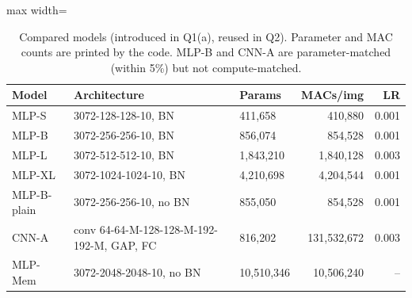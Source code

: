 \begin{table}[!tbp]\centering\footnotesize\setlength{\tabcolsep}{3pt}
\begin{adjustbox}{max width=\textwidth}
\begin{tabular}{lllrr}\toprule
Model & Architecture & Params & MACs/img & LR \\\midrule
MLP-S & 3072-128-128-10, BN & 411,658 & 410,880 & 0.001 \\
MLP-B & 3072-256-256-10, BN & 856,074 & 854,528 & 0.001 \\
MLP-L & 3072-512-512-10, BN & 1,843,210 & 1,840,128 & 0.003 \\
MLP-XL & 3072-1024-1024-10, BN & 4,210,698 & 4,204,544 & 0.001 \\
MLP-B-plain & 3072-256-256-10, no BN & 855,050 & 854,528 & 0.001 \\
CNN-A & conv 64-64-M-128-128-M-192-192-M, GAP, FC & 816,202 & 131,532,672 & 0.003 \\
MLP-Mem & 3072-2048-2048-10, no BN & 10,510,346 & 10,506,240 & -- \\
\bottomrule\end{tabular}
\end{adjustbox}
\caption{Compared models (introduced in Q1(a), reused in Q2). Parameter and MAC counts are printed by the code. MLP-B and CNN-A are parameter-matched (within 5\%) but not compute-matched.}\label{tab:models}\end{table}
